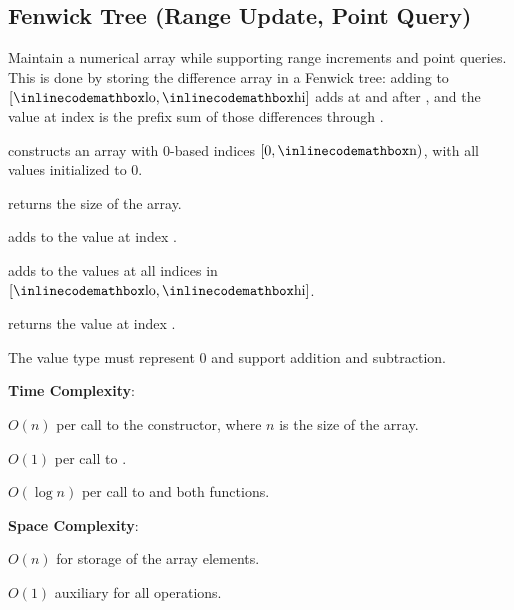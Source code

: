 \subsection{Fenwick Tree (Range Update, Point Query)}
\label{sec:2.7.2}
Maintain a numerical array while supporting range increments and point queries. This is done by storing the difference array in a Fenwick tree: adding  to $[{\inlinecodemath{lo}}, {\inlinecodemath{hi}}]$ adds  at  and  after , and the value at index  is the prefix sum of those differences through .

\begin{compactitem}
  \item {} constructs an array with 0-based indices $[0, {\inlinecodemath{n}})$, with all values initialized to $0$.
  \item {} returns the size of the array.
  \item {} adds  to the value at index .
  \item {} adds  to the values at all indices in $[{\inlinecodemath{lo}}, {\inlinecodemath{hi}}]$.
  \item {} returns the value at index .
\end{compactitem}

The value type  must represent $0$ and support addition and subtraction.

\textbf{Time Complexity}:
\begin{compactitem}
  \item $O(n)$ per call to the constructor, where $n$ is the size of the array.
  \item $O(1)$ per call to .
  \item $O(\log n)$ per call to  and both  functions.
\end{compactitem}

\textbf{Space Complexity}:
\begin{compactitem}
  \item $O(n)$ for storage of the array elements.
  \item $O(1)$ auxiliary for all operations.
\end{compactitem}

